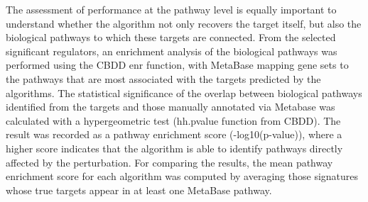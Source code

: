 The assessment of performance at the pathway level is equally important to understand whether the algorithm not only recovers the target itself, but also the biological pathways to which these targets are connected. From the selected significant regulators, an enrichment analysis of the biological pathways was performed using the CBDD enr function, with MetaBase mapping gene sets to the pathways that are most associated with the targets predicted by the algorithms. The statistical significance of the overlap between biological pathways identified from the targets and those manually annotated via Metabase was calculated with a hypergeometric test (hh.pvalue function from CBDD). The result was recorded as a pathway enrichment score (-log10(p-value)), where a higher score indicates that the algorithm is able to identify pathways directly affected by the perturbation. For comparing the results, the mean pathway enrichment score for each algorithm was computed by averaging those signatures whose true targets appear in at least one MetaBase pathway. 



